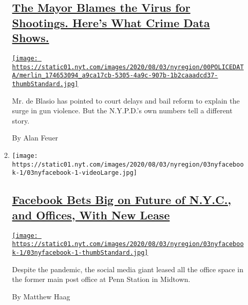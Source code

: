 \begin{enumerate}
\begin{enumerate}
    \hypertarget{the-mayor-blames-the-virus-for-shootings-heres-what-crime-data-shows}{%
    \subsection{\texorpdfstring{\href{/2020/08/04/nyregion/nyc-shootings-coronavirus.html}{The
    Mayor Blames the Virus for Shootings. Here's What Crime Data
    Shows.}}{The Mayor Blames the Virus for Shootings. Here's What Crime Data Shows.}}\label{the-mayor-blames-the-virus-for-shootings-heres-what-crime-data-shows}}

    \href{/2020/08/04/nyregion/nyc-shootings-coronavirus.html}{\texttt{[image: https://static01.nyt.com/images/2020/08/03/nyregion/00POLICEDATA/merlin\_174653094\_a9ca17cb-5305-4a9c-907b-1b2caaadcd37-thumbStandard.jpg]}}

    Mr. de Blasio has pointed to court delays and bail reform to explain
    the surge in gun violence. But the N.Y.P.D.'s own numbers tell a
    different story.

    By Alan Feuer
  \item
    \texttt{[image: https://static01.nyt.com/images/2020/08/03/nyregion/03nyfacebook-1/03nyfacebook-1-videoLarge.jpg]}

    \hypertarget{facebook-bets-big-on-future-of-nyc-and-offices-with-new-lease}{%
    \subsection{\texorpdfstring{\href{/2020/08/03/nyregion/facebook-nyc-office-farley-building.html}{Facebook
    Bets Big on Future of N.Y.C., and Offices, With New
    Lease}}{Facebook Bets Big on Future of N.Y.C., and Offices, With New Lease}}\label{facebook-bets-big-on-future-of-nyc-and-offices-with-new-lease}}

    \href{/2020/08/03/nyregion/facebook-nyc-office-farley-building.html}{\texttt{[image: https://static01.nyt.com/images/2020/08/03/nyregion/03nyfacebook-1/03nyfacebook-1-thumbStandard.jpg]}}

    Despite the pandemic, the social media giant leased all the office
    space in the former main post office at Penn Station in Midtown.

    By Matthew Haag
  \end{enumerate}
\end{enumerate}

